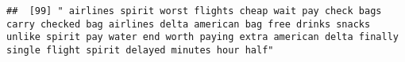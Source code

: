 \documentclass[
]{article}
\begin{document}
\begin{verbatim}
##  [99] " airlines spirit worst flights cheap wait pay check bags carry checked bag airlines delta american bag free drinks snacks unlike spirit pay water end worth paying extra american delta finally single flight spirit delayed minutes hour half"                                                                                                                                                                                                                                                                                                                                                                                                                                                                                                                                                                                                                                                                                                                                                                                                                                                                                                                                                                                                                                                                                                                                                                                                                                                                                                                                                                                                                                                                                                                                                

\end{verbatim}
\end{document}
